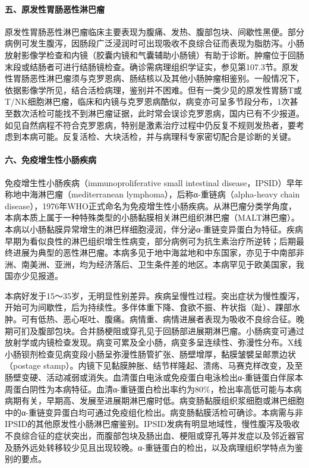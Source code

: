 \paragraph{五、原发性胃肠恶性淋巴瘤}

原发性胃肠恶性淋巴瘤临床主要表现为腹痛、发热、腹部包块、间歇性黑便。部分病例可发生腹泻，因肠段广泛浸润时可出现吸收不良综合征而表现为脂肪泻。小肠放射影像学检查和内镜（胶囊内镜和气囊辅助小肠镜）有助于诊断。肿瘤位于回肠末段或结肠者可进行结肠镜检查。确诊需病理组织学证实，参见第107.3节。原发性胃肠恶性淋巴瘤须与克罗恩病、肠结核以及其他小肠肿瘤相鉴别。一般情况下，依据影像学所见，结合活检病理，鉴别并不困难。但有一类少见的原发性胃肠T或T/NK细胞淋巴瘤，临床和内镜与克罗恩病酷似，病变亦可呈多节段分布，1次甚至数次活检可能找不到淋巴瘤证据，此时常会误诊克罗恩病，国内已有不少报道。如见自然病程不符合克罗恩病，特别是激素治疗过程中仍反复不规则发热者，要考虑到本病可能。反复活检、大块活检，并与病理科专家密切配合是诊断的关键。

\paragraph{六、免疫增生性小肠疾病}

免疫增生性小肠疾病（immunoproliferative small intestinal
disease，IPSID）早年称地中海淋巴瘤（mediterranean
lymphoma），后称α-重链病（alpha-heavy chain
disease），1976年WHO正式命名为免疫增生性小肠疾病。从淋巴瘤分类学角度，本病本质上属于一种特殊类型的小肠黏膜相关淋巴组织淋巴瘤（MALT淋巴瘤）。本病以小肠黏膜异常增生的淋巴样细胞浸润，伴分泌α-重链变异蛋白为特征。疾病早期为看似良性的淋巴组织增生性病变，部分病例可为抗生素治疗所逆转；后期最终进展为典型的恶性淋巴瘤。本病多见于地中海盆地和中东国家，亦见于中南部非洲、南美洲、亚洲，均为经济落后、卫生条件差的地区。本病罕见于欧美国家，我国亦少见报道。

本病好发于15～35岁，无明显性别差异。疾病呈慢性过程。突出症状为慢性腹泻，开始可为间歇性，后为持续性。多伴体重下降、食欲不振、杵状指（趾）、踝部水肿。可有低热、恶心呕吐、腹痛。病情重、病情进展者表现为吸收不良综合征。晚期可扪及腹部包块。合并肠梗阻或穿孔见于回肠部进展期淋巴瘤。小肠病变可通过放射学或内镜检查发现。病变可累及全小肠，病变多呈连续性、弥漫性分布。X线小肠钡剂检查见病变段小肠呈弥漫性肠管扩张、肠壁增厚，黏膜皱襞呈邮票边状（postage
stamp）。内镜下见黏膜肿胀、结节样隆起、溃疡、马赛克样改变，及至肠壁变硬、活动减弱或消失。血清蛋白电泳或免疫蛋白电泳检出α-重链蛋白伴尿本周蛋白阴性为本病特征。血清α-重链蛋白检出率约为80\%，检出率高低可能与本病病期有关，早期高、发展至进展期淋巴瘤时低。病变肠黏膜组织浆细胞或淋巴细胞中的α-重链变异蛋白均可通过免疫组化检出。病变肠黏膜活检可确诊。本病需与非IPSID的其他原发性小肠淋巴瘤鉴别。IPSID发病有明显地域性，慢性腹泻及吸收不良综合征的症状突出，而腹部包块及肠出血、梗阻或穿孔等并发症以及邻近器官及肠外远处转移较少见且出现较晚。α-重链蛋白的检出，以及病理组织学特点为鉴别的要点。

